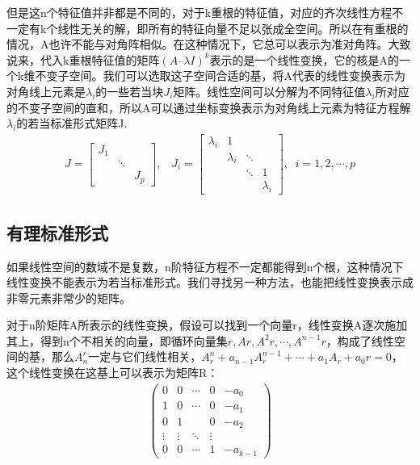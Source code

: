	但是这n个特征值并非都是不同的，对于k重根的特征值，对应的齐次线性方程不一定有k个线性无关的解，即所有的特征向量不足以张成全空间。所以在有重根的情况，A也许不能与对角阵相似。在这种情况下，它总可以表示为准对角阵。大致说来，代入k重根特征值的矩阵$ (A –\lambda I)^k $表示的是一个线性变换，它的核是A的一个k维不变子空间。我们可以选取这子空间合适的基，将A代表的线性变换表示为对角线上元素是$ \lambda_i $的一些若当块$ J_i $矩阵。线性空间可以分解为不同特征值$ \lambda_i $所对应的不变子空间的直和，所以A可以通过坐标变换表示为对角线上元素为特征方程解$ \lambda_i $的若当标准形式矩阵J.
	\begin{gather*}
		J={\begin{bmatrix}J_{1}&\;&\;\\\;&\ddots &\;\\\;&\;&J_{p}\end{bmatrix}},  \;\;\; J_{i} = {\begin{bmatrix}\lambda _{i} &1&\;&\;\\\;&\lambda _{i}&\ddots &\;\\\;&\;&\ddots &1\\\;&\;&\;&\lambda _{i}\end{bmatrix}}, \;\;i=1,2,\cdots,p
	\end{gather*}

	\subsection{有理标准形式}
	
	如果线性空间的数域不是复数，n阶特征方程不一定都能得到n个根，这种情况下线性变换不能表示为若当标准形式。我们寻找另一种方法，也能把线性变换表示成非零元素非常少的矩阵。
	
	对于n阶矩阵A所表示的线性变换，假设可以找到一个向量r，线性变换A逐次施加其上，得到n个不相关的向量，即循环向量集$ {r , Ar, A^2r, \cdots, A^{n-1}r} $，构成了线性空间的基，那么$ A_{n}^{r} $一定与它们线性相关，$ A^{n}_{r} +a_{n-1} A^{n-1}_r + \cdots + a_1A_r+ a_0r = 0 $，这个线性变换在这基上可以表示为矩阵R：
	\begin{gather*}
		\begin{pmatrix}0 &0& \cdots &0& -a_{0}\\ 1 &0& \cdots &0& -a_{1}\\ 0 &1&  &0& -a_{2}\\  \vdots & \vdots &\ddots & \vdots\\ 0 &0& \cdots & 1& -a_{k-1} \end{pmatrix}
	\end{gather*}

